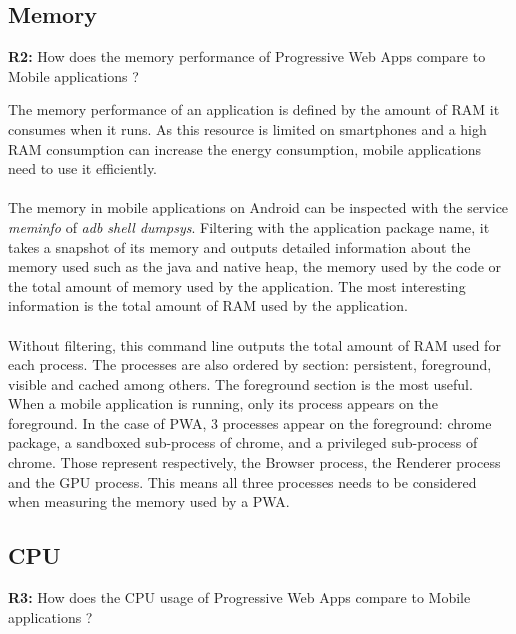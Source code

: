 \documentclass{kththesis}
\begin{document}
\subsection{Memory}

\textbf{R2:} How does the memory performance of Progressive Web Apps compare to Mobile applications ?

The memory performance of an application is defined by the amount of RAM it consumes when it runs. As this resource is limited on smartphones and a high RAM consumption can increase the energy consumption, mobile applications need to use it efficiently. 

\paragraph{}
The memory in mobile applications on Android can be inspected with the service \textit{meminfo} of \textit{adb shell dumpsys}. Filtering with the application package name, it takes a snapshot of its memory and outputs detailed information about the memory used such as the java and native heap, the memory used by the code or the total amount of memory used by the application. The most interesting information is the total amount of RAM used by the application.

\paragraph{}
Without filtering, this command line outputs the total amount of RAM used for each process. The processes are also ordered by section: persistent, foreground, visible and cached among others. \newline
The foreground section is the most useful. When a mobile application is running, only its process appears on the foreground. In the case of PWA, 3 processes appear on the foreground:  chrome package, a sandboxed sub-process of chrome, and a privileged sub-process of chrome. Those represent respectively, the Browser process, the Renderer process and the GPU process. This means all three processes needs to be considered when measuring the memory used by a PWA. 
    
\subsection{CPU}

\textbf{R3:} How does the CPU usage of Progressive Web Apps compare to Mobile applications ?
\end{document}
